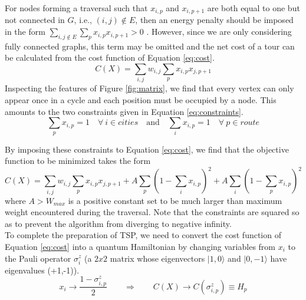 For nodes forming a traversal such that $x_{i,p}$ and $x_{i,p+1}$ are both equal to one but not connected in $G$, i.e., $(i,j)\notin E$, then an energy penalty should be imposed in the form $\sum_{i,j \notin E}\sum_p x_{i,p}x_{i,p+1}>0$ \cite{lucas2014ising}.
However, since we are only considering fully connected graphs, this term may be omitted and the net cost of a tour can be calculated from the cost function of Equation \ref{eq:cost}.
\begin{equation}
	C(X)=\sum_{i,j}w_{i,j} \sum_p x_{i,p}x_{j,p+1} 
	\label{eq:cost}
\end{equation}
Inspecting the features of Figure \ref{fig:matrix}, we find that every vertex can only appear once in a cycle and each position must be occupied by a node. 
This amounts to the two constraints given in Equation \ref{eq:constraints}.
\begin{equation}
	\sum_p x_{i,p}=1 \quad \forall \: i \in cities \quad \text{and} \quad \sum_i x_{i,p}=1 \quad \forall \: p \in route
	\label{eq:constraints}
\end{equation}

By imposing these constraints to Equation \ref{eq:cost}, we find that the objective function to be minimized takes the form
\begin{equation}
	C(X)=\sum_{i,j}w_{i,j} \sum_p x_{i,p}x_{j,p+1} + A\sum_p (1 - \sum_i x_{i,p})^2 + A\sum_i (1 - \sum_p x_{i,p})^2
	\label{eq:hamiltoniancircuit}
\end{equation}
where $A>W_{max}$ is a positive constant set to be much larger than maximum weight encountered during the traversal. Note that the constraints are squared so as to prevent the algorithm from diverging to negative infinity. \\

To complete the preparation of TSP, we need to convert the cost function of Equation \ref{eq:cost} into a quantum Hamiltonian by changing variables from $x_i$ to the Pauli operator $\sigma_i^z$ (a $2x2$ matrix whose eigenvectors $|1,0\rangle$ and $|0,-1\rangle$ have eigenvalues (+1,-1)). 
\begin{equation}
	x_i \rightarrow \frac{ 1-\sigma_{i,p}^z}{2} \qquad \Rightarrow \qquad C(X) \rightarrow C(\sigma_{i,p}^z) \equiv H_p
	\label{eq:transformation}
\end{equation}